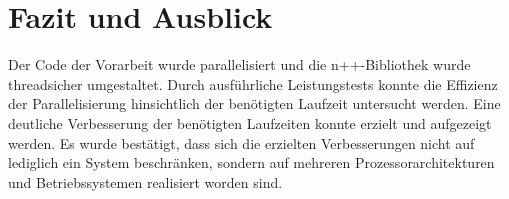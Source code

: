 \chapter{Fazit und Ausblick}
\label{ch:Zusammenfassung}

Der Code der Vorarbeit wurde parallelisiert und die n++-Bibliothek wurde threadsicher umgestaltet. Durch ausführliche Leistungstests konnte die Effizienz der Parallelisierung hinsichtlich der benötigten Laufzeit untersucht werden. Eine deutliche Verbesserung der benötigten Laufzeiten konnte erzielt und aufgezeigt werden. Es wurde bestätigt, dass sich die erzielten Verbesserungen nicht auf lediglich ein System beschränken, sondern auf mehreren Prozessorarchitekturen und Betriebssystemen realisiert worden sind.
